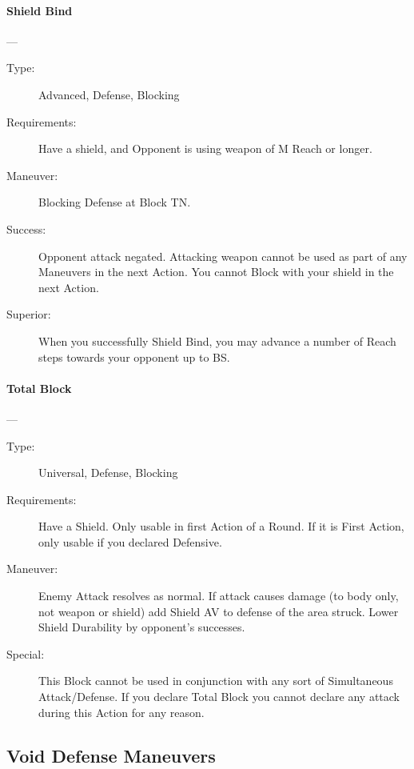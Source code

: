 \documentclass[oneside,11pt,english]{book}
\begin{document}
\paragraph{\large\label{man:Shield Bind}Shield Bind}---\quad{\large[X+1]}
\vspace{-10pt}\begin{description} 
\item [Type:] Advanced, Defense, Blocking 
\item [Requirements:] Have a shield, and Opponent is using weapon of M Reach or longer. 
\item [Maneuver:] Blocking Defense at Block TN. 
\item [Success:] Opponent attack negated. Attacking weapon cannot be used as part of any Maneuvers in the next 
Action. You cannot Block with your shield in the next Action. 
\item [Superior:] When you successfully Shield Bind, you may advance a number of Reach steps towards your 
opponent up to BS. 
\end{description}
\paragraph{\large\label{man:Total Block}Total Block}---
\vspace{-10pt}\begin{description} 
\item [Type:] Universal, Defense, Blocking 
\item [Requirements:] Have a Shield. Only usable in first Action of a Round. If it is First Action, only usable if 
you declared Defensive. 
\item [Maneuver:] Enemy Attack resolves as normal. If attack causes damage (to body only, not weapon or 
shield) add Shield AV to defense of the area struck. 
Lower Shield Durability by opponent’s successes. 
\item [Special:] This Block cannot be used in conjunction with any sort of Simultaneous Attack/Defense. If you 
declare Total Block you cannot declare any attack during this Action for any reason. 
\end{description}
\subsection{Void Defense Maneuvers}
\end{document}

